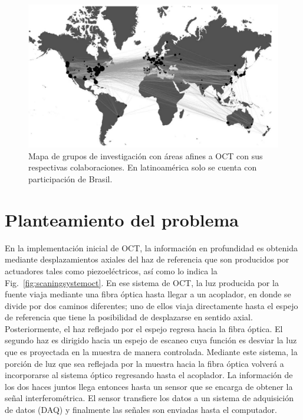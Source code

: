 \begin{figure}[ht!]
	\centering
	\includegraphics[width=0.7\linewidth]{img/chap1/oct_groups_2015}
	\caption[Mapa de grupos de investigación involucrados en OCT.]{Mapa de grupos de investigación con áreas afines a OCT con sus respectivas colaboraciones. En latinoamérica solo se cuenta con participación de Brasil.}
	\label{fig:octgroups2015}
\end{figure}




%	


\section{Planteamiento del problema}
\label{sec:plant_problemo}
En la implementación inicial de OCT, la información en profundidad es obtenida mediante desplazamientos axiales del haz de referencia que son producidos por actuadores tales como piezoeléctricos, así como lo indica la Fig.~\ref{fig:scaningsystemoct}. En ese sistema de OCT, la luz producida por la fuente viaja mediante una fibra óptica hasta llegar a un acoplador, en donde se divide por dos caminos diferentes; uno de ellos viaja directamente hasta el espejo de referencia que tiene la posibilidad de desplazarse en sentido axial. Posteriormente, el haz reflejado por el espejo regresa hacia la fibra óptica. El segundo haz es dirigido hacia un espejo de escaneo cuya función es desviar la luz que es proyectada en la muestra de manera controlada. Mediante este sistema, la porción de luz que sea reflejada por la muestra hacia la fibra óptica volverá a incorporarse al sistema óptico regresando hasta el acoplador. La información de los dos haces juntos llega entonces hasta un sensor que se encarga de obtener la señal interferométrica. El sensor transfiere los datos a un sistema de adquisición de datos (DAQ) y finalmente las señales son enviadas hasta el computador. 

